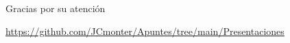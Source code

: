\documentclass[compress,12pt]{beamer}
\begin{document}
\begin{frame}
      \centering
      \Huge{\smiley Gracias por su atención\smiley}
      \vfill
      \scalebox{4}{\faGithub} \par\bigskip
      \url{https://github.com/JCmonter/Apuntes/tree/main/Presentaciones} \\
\end{frame}
\end{document}
